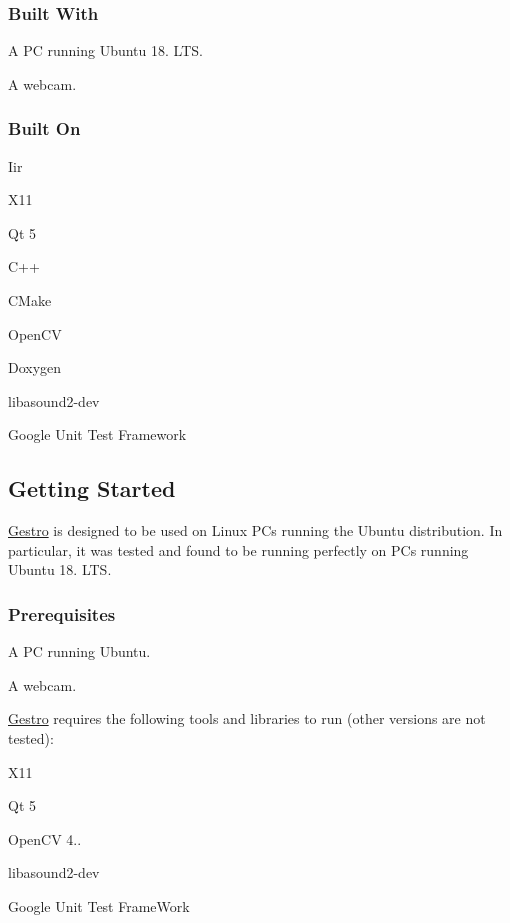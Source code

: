 \subsubsection*{Built With}


\begin{DoxyItemize}
\item A PC running Ubuntu 18. L\+TS.
\item A webcam.
\end{DoxyItemize}

\subsubsection*{Built On}


\begin{DoxyItemize}
\item Iir
\item X11
\item Qt 5
\item C++
\item C\+Make
\item Open\+CV
\item Doxygen
\item libasound2-\/dev
\item Google Unit Test Framework
\end{DoxyItemize}

\subsection*{Getting Started}

\hyperlink{namespace_gestro}{Gestro} is designed to be used on Linux P\+Cs running the Ubuntu distribution. In particular, it was tested and found to be running perfectly on P\+Cs running Ubuntu 18. L\+TS.

\subsubsection*{Prerequisites}


\begin{DoxyItemize}
\item A PC running Ubuntu.
\item A webcam.
\end{DoxyItemize}

\hyperlink{namespace_gestro}{Gestro} requires the following tools and libraries to run (other versions are not tested)\+:
\begin{DoxyItemize}
\item X11
\item Qt 5
\item Open\+CV 4..
\item libasound2-\/dev
\item Google Unit Test Frame\+Work
\end{DoxyItemize}

